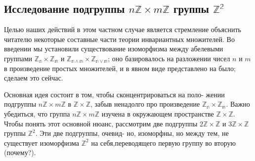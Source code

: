\subsection{Исследование подгруппы $n\mathbb{Z} \times m\mathbb{Z}$ группы $\mathbb{Z^2}$}
\noindent Целью наших действий в этом частном случае является стремление \linebreak объяснить читателю некоторые составные части теории инвариантных \linebreak множителей. Во введении мы установили существование изоморфизма \linebreak между абелевыми группами $\mathbb{Z_n} \times \mathbb{Z_m}$ и $\mathbb{Z_{n \wedge m}} \times \mathbb{Z_{n \vee m}}$; оно базировалось \linebreak на разложении чисел $n$ и $m$ в произведение простых множителей, и в \linebreak явном виде представлено на было; сделаем это сейчас.
  
Основная идея состоит в том, чтобы сконцентрироваться на поло- \linebreak жении подгруппы $n\mathbb{Z} \times m\mathbb{Z}$ в $\mathbb{Z} \times \mathbb{Z}$, забыв ненадолго про произведение \linebreak $\mathbb{Z_n} \times \mathbb{Z_m}$. Важно убедиться, что группа $n\mathbb{Z} \times m\mathbb{Z}$ изучена в окружающем \linebreak пространстве $\mathbb{Z}\times \mathbb{Z}$. Чтобы понять этот основной нюанс, рассмотрим \linebreak две подгруппы $2\mathbb{Z} \times \mathbb{Z}$ и $3\mathbb{Z} \times \mathbb{Z}$ группы $\mathbb{Z}^2$. Эти две подгруппы, очевид- \linebreak но, изоморфны, но между тем, не существует изоморфизма $\mathbb{Z}^2$ на себя,\linebreak переводящего первую группу во вторую (почему?).
  
